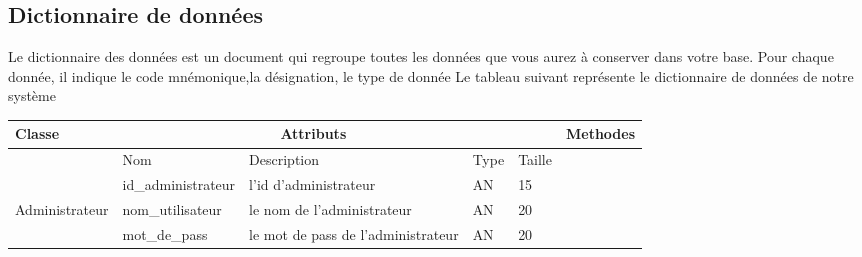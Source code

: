 \documentclass[edit,12pt,a4paper,ChapStyle,oneside,doubleinterligne]{report}
\begin{document}
\subsection{Dictionnaire de données}
Le dictionnaire des données est un document qui regroupe toutes les données que vous
aurez à conserver dans votre base. Pour chaque donnée, il indique le code mnémonique,la
désignation, le type de donnée
\newline Le tableau suivant représente le dictionnaire de données de notre système
\begin{table}[H]
    \centering
    \begin{tabular}{ | m{} | m{}| m{3cm} |m{}|m{}|l|}
    \hline
         Classe&\multicolumn{3}{c}{Attributs}&\phantom{h} &Methodes\\
         \hline &Nom&Description&Type&Taille&\\\cline{2-5}
                                        &id\_administrateur&l'id d'administrateur&AN&15& \\\cline{2-5}
                        Administrateur  &nom\_utilisateur&le nom de l'administrateur&AN&20& \\\cline{2-5}
                                        &mot\_de\_pass&le mot de pass de l'administrateur &AN&20& \\\hline

 \end{tabular}
\end{table}
\end{document}
